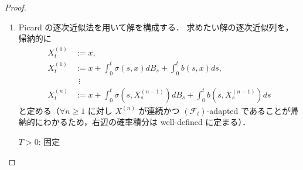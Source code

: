 \documentclass{jsarticle}
\begin{document}
\begin{proof}
\begin{enumerate}[label=(\roman*)]
        よって関数 $[0, T]\ni t\mapsto E[(X_{t\wedge\tau_M}-X'_{t\wedge\tau_M})^2]\in[0, \infty)$ を $h$ と定めると，$\forall t\in[0, T]$ に対し
        $$
        h(t)
        \le C\int_0^t h(s)ds.
        $$
        
        ここで $\tau_M$ の定め方から $\left\lvert X_{t\wedge\tau_M}\right\rvert\vee\left\lvert X'_{t\wedge\tau_M}\right\rvert\le M,$ ゆえに $(X_{t\wedge\tau_M})^2, (X'_{t\wedge\tau_M})^2\le M^2$ が言えるので
                \begin{align}
                    h(t)
                    &= E[(X_{t\wedge\tau_M}-X'_{t\wedge\tau_M})^2] \\
                    &\le 2(E[(X_{t\wedge\tau_M})^2]+E[(X'_{t\wedge\tau_M})^2]) \le 4M^2.
                \end{align}
        したがって $h$ は有界なので Lemma \ref{lem:804} が適用でき，$h(t)\le0\cdot e^{Ct}=0$ より $h\equiv0.$
        ゆえに $X, X'$ の連続性と合わせて $P(\forall t\in[0, T], X_{t\wedge\tau_M}=X'_{t\wedge\tau_M})=1$ が成り立つ．
        また a.s. で $\lim_{M\to\infty}\tau_M=\infty$ となるので $P(\forall t\in[0, T], X_t=X'_t)=1.$
        よって pathwise uniqueness が成り立つことが言えた．
        
        \item
        Picard の逐次近似法を用いて解を構成する．
        求めたい解の逐次近似列を，帰納的に
        \begin{align}
            X_t^{(0)}
            &:= x, \\
            X_t^{(1)}
            &:= x
            + \int_0^t \sigma(s, x)dB_s
            + \int_0^t b(s, x)ds, \\
            &\ \ \vdots \\
            X_t^{(n)}
            &:= x
            + \int_0^t \sigma(s, X_s^{(n-1)})dB_s
            + \int_0^t b(s, X_s^{(n-1)})ds
        \end{align}
        と定める（$\forall n\ge1$ に対し $X^{(n)}$ が連続かつ $(\mathcal{F}_t)$-adapted であることが帰納的にわかるため，右辺の確率積分は well-defined に定まる）．

        $T>0$: 固定


\end{enumerate}
\end{proof}
\end{document}
